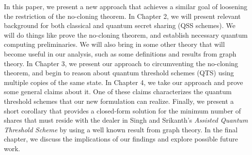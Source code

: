 In this paper, we present a new approach that achieves a similar goal of loosening the restriction of the no-cloning theorem. In Chapter 2, we will present relevant background for both classical and quantum secret sharing (QSS schemes). We will do things like prove the no-cloning theorem, and establish necessary quantum computing preliminaries. We will also bring in some other theory that will become useful in our analysis, such as some definitions and results from graph theory. In Chapter 3, we present our approach to circumventing the no-cloning theorem, and begin to reason about quantum threshold schemes (QTS) using multiple copies of the same state. In Chapter 4, we take our approach and prove some general claims about it. One of these claims characterizes the quantum threshold schemes that our new formulation can realize. Finally, we present a short corollary that provides a closed-form solution for the minimum number of shares that must reside with the dealer in Singh and Srikanth's \textit{Assisted Quantum Threshold Scheme} by using a well known result from graph theory. In the final chapter, we discuss the implications of our findings and explore possible future work.